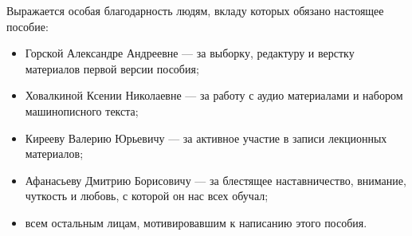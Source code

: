 Выражается особая благодарность людям, вкладу которых обязано настоящее пособие:

\begin{itemize}

	\item Горской Александре Андреевне --- за выборку, редактуру и верстку материалов первой версии пособия;
	\item Ховалкиной Ксении Николаевне --- за работу с аудио материалами и набором машинописного текста;
	\item Кирееву Валерию Юрьевичу --- за активное участие в записи лекционных материалов;
	\item Афанасьеву Дмитрию Борисовичу --- за блестящее наставничество, внимание, чуткость и любовь, с которой он нас всех обучал;
	\item всем остальным лицам, мотивировавшим к написанию этого пособия.
	
	
\end{itemize}
 
